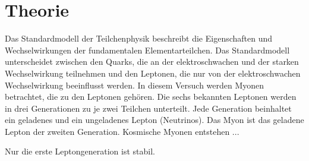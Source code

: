 \section{Theorie}
\label{sec:theorie}

Das Standardmodell der Teilchenphysik beschreibt die Eigenschaften und
Wechselwirkungen der fundamentalen Elementarteilchen. Das Standardmodell
unterscheidet zwischen den Quarks, die an der elektroschwachen und der starken
Wechselwirkung teilnehmen und den Leptonen, die nur von der elektroschwachen
Wechselwirkung beeinflusst werden. In diesem Versuch werden Myonen betrachtet,
die zu den Leptonen gehören. Die sechs bekannten Leptonen werden in drei
Generationen zu je zwei Teilchen unterteilt. Jede Generation beinhaltet ein
geladenes und ein ungeladenes Lepton (Neutrinos). Das Myon ist das geladene
Lepton der zweiten Generation. Kosmische Myonen entstehen ...


Nur die erste Leptongeneration ist stabil.
